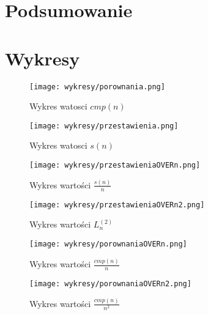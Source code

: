 \documentclass{article}
\begin{document}
\section{Podsumowanie}

\section{Wykresy}
\begin{figure}[ht]
    \centering
    \texttt{[image: wykresy/porownania.png]}
    \caption{Wykres watosci $cmp(n)$}
    \label{fig:cmp}
\end{figure}
\begin{figure}[ht]
    \centering
    \texttt{[image: wykresy/przestawienia.png]}
    \caption{Wykres watosci $s(n)$}
    \label{fig:s}
\end{figure}
\begin{figure}[ht]
    \centering
    \texttt{[image: wykresy/przestawieniaOVERn.png]}
    \caption{Wykres wartości $\frac{s(n)}{n}$}
    \label{fig:sOvern}
\end{figure}
\begin{figure}[ht]
    \centering
    \texttt{[image: wykresy/przestawieniaOVERn2.png]}
    \caption{Wykres wartości $L_n^{(2)}$}
    \label{fig:Ln1}
\end{figure}
\begin{figure}[ht]
    \centering
    \texttt{[image: wykresy/porownaniaOVERn.png]}
    \caption{Wykres wartości $\frac{cmp(n)}{n}$}
    \label{fig:cmpOvern}
\end{figure}
\begin{figure}[ht]
    \centering
    \texttt{[image: wykresy/porownaniaOVERn2.png]}
    \caption{Wykres wartości $\frac{cmp(n)}{n^2}$}
    \label{fig:cmpOvern2}
\end{figure}
\end{document}
